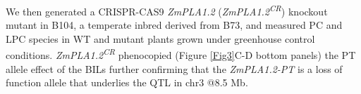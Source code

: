 \documentclass[9pt,twocolumn,twoside,lineno]{BioRxiv}
\begin{document}
We then generated a CRISPR-CAS9 \textit{ZmPLA1.2} (\textit{ZmPLA1.2\textsuperscript{CR}}) knockout mutant in B104, a temperate inbred derived from B73, and measured PC and LPC species in WT and mutant plants grown under greenhouse control conditions. 
\textit{ZmPLA1.2\textsuperscript{CR}} phenocopied (Figure \ref{Fig3}C-D bottom panels) the PT allele effect of the BILs further confirming that the \textit{ZmPLA1.2-PT} is a loss of function allele that underlies the QTL in chr3 @8.5 Mb. 
\end{document}
